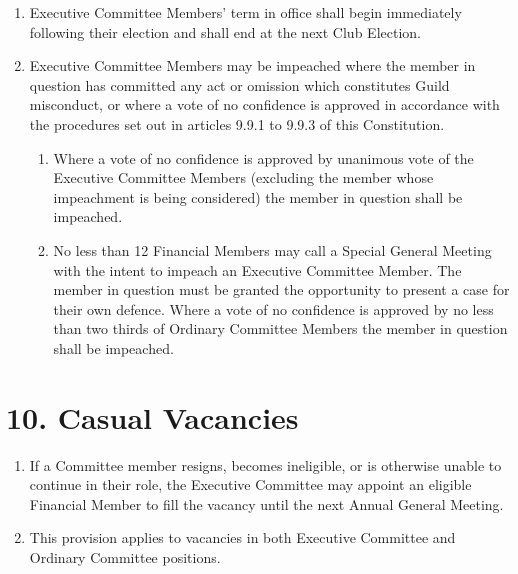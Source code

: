\documentclass[12pt]{article}
\begin{document}
\begin{enumerate}[label=9.\arabic*]
\begin{enumerate}[label=\theenumi.\arabic*]
    \end{enumerate}
\item Executive Committee Members' term in office shall begin immediately following their election and shall end at the next Club Election.
\item Executive Committee Members may be impeached where the member in question has committed any act or omission which constitutes Guild misconduct, or where a vote of no confidence is approved in accordance with the procedures set out in articles 9.9.1 to 9.9.3 of this Constitution.
    \begin{enumerate}[label=\theenumi.\arabic*]
        \item Where a vote of no confidence is approved by unanimous vote of the Executive Committee Members (excluding the member whose impeachment is being considered) the member in question shall be impeached.
        \item No less than 12 Financial Members may call a Special General Meeting with the intent to impeach an Executive Committee Member. The member in question must be granted the opportunity to present a case for their own defence. Where a vote of no confidence is approved by no less than two thirds of Ordinary Committee Members the member in question shall be impeached.
    \end{enumerate}
\end{enumerate}

\section{10. Casual Vacancies}
\begin{enumerate}[label=10.\arabic*]
 \item If a Committee member resigns, becomes ineligible, or is otherwise unable to continue in their role, the Executive Committee may appoint an eligible Financial Member to fill the vacancy until the next Annual General Meeting.
 \item This provision applies to vacancies in both Executive Committee and Ordinary Committee positions.
\end{enumerate}
%
\end{document}
